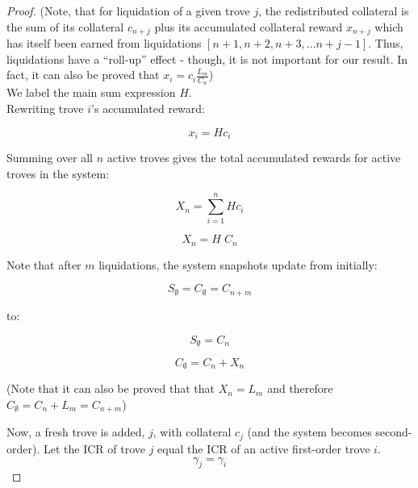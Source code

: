 \documentclass[reqno]{article}
\begin{document}
\begin{proof}
\bigskip
(Note, that for liquidation of a given trove $j$, the redistributed collateral is the sum of its collateral $c_{n+j}$ plus its accumulated collateral reward $x_{n+j}$ which has itself been earned from liquidations $[n+1, n+2, n+3, … n+j-1]$.  Thus, liquidations have a “roll-up” effect - though, it is not important for our result. In fact, it can also be proved that $x_i=c_i\frac{L_m}{C_n}$)\\

We label the main sum expression $H$.\\

Rewriting trove $i$’s accumulated reward:

\begin{equation} \label{eq:45}
    x_i=Hc_i
\end{equation}

\bigskip
Summing over all $n$ active troves gives the total accumulated rewards for active troves in the system:

\begin{equation} 
    X_n=\sum\limits^n_{i=1}Hc_i
\end{equation}

\begin{equation} \label{eq:47}
    X_n=H \; C_n
\end{equation}

\bigskip
Note that after $m$ liquidations, the system snapshots update from initially:

\begin{equation}
    S_\emptyset = C_\emptyset = C_{n+m}
\end{equation}

to:

\begin{equation} \label{eq:8}
    S_\emptyset=C_n
\end{equation}

\begin{equation} \label{eq:9}
    C_\emptyset=C_n+X_n
\end{equation}

\bigskip
(Note that it can also be proved that that $X_n=L_m$ and therefore $C_\emptyset=C_n+L_m=C_{n+m}$)

\bigskip
Now, a fresh trove is added, $j$, with collateral $c_j$ (and the system becomes second-order). Let the ICR of trove $j$ equal the ICR of an active first-order trove $i$.\\

\begin{equation} \label{eq:10}
    \gamma_j=\gamma_i
\end{equation}


\end{proof}
\end{document}
